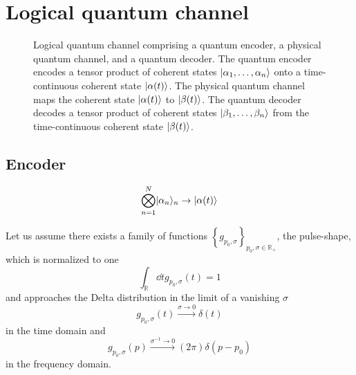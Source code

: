 \section{Logical quantum channel}

\begin{figure}[htb]
	\centering
	
	\caption{Logical quantum channel comprising a quantum encoder, a physical quantum channel, and a quantum decoder. The quantum encoder encodes a tensor product of coherent states $\lvert\alpha_1,\dots,\alpha_n\rangle$ onto a time-continuous coherent state $\lvert\alpha(t)\rangle$. The physical quantum channel maps the coherent state $\lvert\alpha(t)\rangle$ to $\lvert\beta(t)\rangle$. The quantum decoder decodes a tensor product of coherent states $\lvert\beta_1,\dots,\beta_n\rangle$ from the time-continuous coherent state $\lvert\beta(t)\rangle$.}
\end{figure}

\subsection{Encoder}

\begin{equation}
	\bigotimes_{n=1}^N
	\lvert\alpha_n\rangle_n
	\to
	\lvert\alpha(t)\rangle
\end{equation}

Let us assume there exists a family of functions $\left\{g_{p_0,\sigma}\right\}_{p_0,\sigma\in\mathbb{R}_+}$, the pulse-shape, which is normalized to one
\begin{equation}
	\int_{\mathbb{R}}
	\dd{t}
	g_{p_0,\sigma}(t)
	=
	1	
\end{equation}
and approaches the Delta distribution in the limit of a vanishing $\sigma$
\begin{equation}
	g_{p_0,\sigma}(t)
	\xrightarrow{\sigma\to0}
	\delta(t)
\end{equation}
in the time domain and
\begin{equation}
	g_{p_0,\sigma}(p)
	\xrightarrow{\sigma^{-1}\to0}
	(2\pi)
	\delta(p-p_0)
\end{equation}
in the frequency domain.

